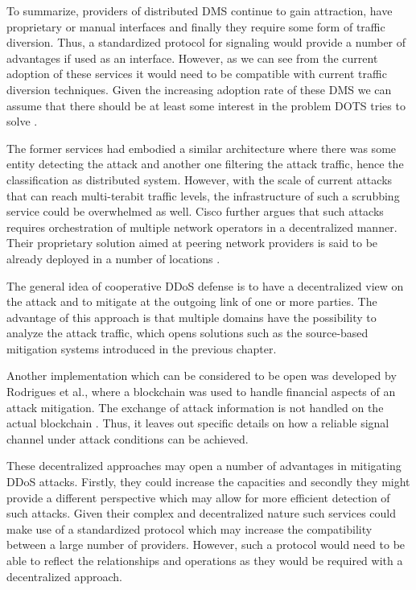 To summarize, providers of distributed DMS continue to gain attraction, have proprietary or manual interfaces and finally they require some form of traffic diversion. Thus, a standardized protocol for signaling would provide a number of advantages if used as an interface. However, as we can see from the current adoption of these services it would need to be compatible with current traffic diversion techniques. Given the increasing adoption rate of these DMS we can assume that there should be at least some interest in the problem DOTS tries to solve \cite{dps-adoption}.

The former services had embodied a similar architecture where there was some entity detecting the attack and another one filtering the attack traffic, hence the classification as distributed system. However, with the scale of current attacks that can reach multi-terabit traffic levels, the infrastructure of such a scrubbing service could be overwhelmed as well. Cisco further argues that such attacks requires orchestration of multiple network operators in a decentralized manner. Their proprietary solution aimed at peering network providers is said to be already deployed in a number of locations \cite{ciscodecentralizedddos}.

The general idea of cooperative DDoS defense is to have a decentralized view on the attack and to mitigate at the outgoing link of one or more parties. The advantage of this approach is that multiple domains have the possibility to analyze the attack traffic, which opens solutions such as the source-based mitigation systems introduced in the previous chapter.

Another implementation which can be considered to be open was developed by Rodrigues et al., where a blockchain was used to handle financial aspects of an attack mitigation. The exchange of attack information is not handled on the actual blockchain \cite{blockchain-collaborative-defense}. Thus, it leaves out specific details on how a reliable signal channel under attack conditions can be achieved.

These decentralized approaches may open a number of advantages in mitigating DDoS attacks. Firstly, they could increase the capacities and secondly they might provide a different perspective which may allow for more efficient detection of such attacks. Given their complex and decentralized nature such services could make use of a standardized protocol which may increase the compatibility between a large number of providers. However, such a protocol would need to be able to reflect the relationships and operations as they would be required with a decentralized approach.

